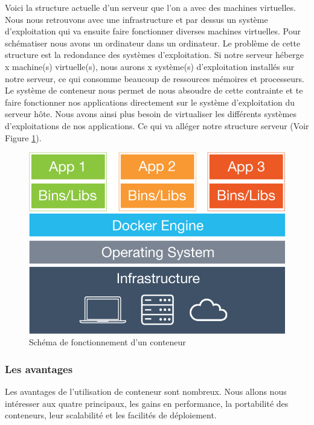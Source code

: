       Voici la structure actuelle d’un serveur que l’on a avec des machines virtuelles. Nous nous retrouvons avec une infrastructure et par dessus un système d’exploitation qui va ensuite faire fonctionner diverses machines virtuelles. Pour schématiser nous avons un ordinateur dans un ordinateur. Le problème de cette structure est la redondance des systèmes d’exploitation. Si notre serveur héberge x machine(s) virtuelle(s), nous aurons x système(s) d’exploitation installés sur notre serveur, ce qui consomme beaucoup de ressources mémoires et processeurs.\\

      Le système de conteneur nous permet de nous absoudre de cette contrainte et te faire fonctionner nos applications directement sur le système d’exploitation du serveur hôte. Nous avons ainsi plus besoin de virtualiser les différents systèmes d’exploitations de nos applications. Ce qui va alléger notre structure serveur (Voir Figure \ref{Container}).\\

      \begin{figure}
        \begin{center}
          \includegraphics[scale=0.2]{images/container.png}
        \end{center}
        \caption{Schéma de fonctionnement d'un conteneur}
        \label{Container}
      \end{figure}

      \subsubsection{Les avantages}
      Les avantages de l’utilisation de conteneur sont nombreux. Nous allons nous intéresser aux quatre principaux, les gains en performance, la portabilité des conteneurs, leur scalabilité et les facilités de déploiement.\\

